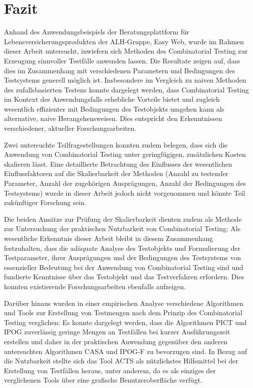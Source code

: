 \chapter{Fazit}

Anhand des Anwendungsbeispiels der Beratungsplattform für Lebensversicherungsprodukten der ALH-Gruppe, Easy Web, wurde im Rahmen dieser Arbeit untersucht, inwiefern sich Methoden des Combinatorial Testing zur Erzeugung sinnvoller Testfälle anwenden lassen. Die Resultate zeigen auf, dass dies im Zusammenhang mit verschiedenen Parametern und Bedingungen des Testsystems generell möglich ist. Insbesondere im Vergleich zu naiven Methoden des zufallsbasierten Testens konnte dargelegt werden, dass Combinatorial Testing im Kontext des Anwendungsfalls erhebliche Vorteile bietet und zugleich wesentlich effizienter mit Bedingungen des Testobjekts umgehen kann als alternative, naive Herangehensweisen. Dies entspricht den Erkenntnissen verschiedener, aktueller Forschungsarbeiten.

Zwei untersuchte Teilfragestellungen konnten zudem belegen, dass sich die Anwendung von Combinatorial Testing unter geringfügigen, zusätzlichen Kosten skalieren lässt. Eine detaillierte Betrachtung des Einflusses der wesentlichen Einflussfaktoren auf die Skalierbarkeit der Methoden (Anzahl zu testender Parameter, Anzahl der zugehörigen Ausprägungen, Anzahl der Bedingungen des Testsystems) wurde in dieser Arbeit jedoch nicht vorgenommen und könnte Teil zukünftiger Forschung sein.

Die beiden Ansätze zur Prüfung der Skalierbarkeit dienten zudem als Methode zur Untersuchung der praktischen Nutzbarkeit von Combinatorial Testing: Als wesentliche Erkenntnis dieser Arbeit bleibt in diesem Zusammenhang festzuhalten, dass die adäquate Analyse des Testobjekts und Formulierung der Testparameter, ihrer Ausprägungen und der Bedingungen des Testsystems von essenzieller Bedeutung bei der Anwendung von Combinatorial Testing sind und fundierte Kenntnisse über das Testobjekt und das Testverfahren erfordern. Dies konnten existierende Forschungsarbeiten ebenfalls aufzeigen.

Darüber hinaus wurden in einer empirischen Analyse verschiedene Algorithmen und Tools zur Erstellung von Testmengen nach dem Prinzip des Combinatorial Testing verglichen: Es konnte dargelegt werden, dass die Algorithmen PICT und IPOG zuverlässig geringe Mengen an Testfällen bei kurzer Ausführungszeit erstellen und daher in der praktischen Anwendung gegenüber den anderen untersuchten Algorithmen CASA und IPOG-F zu bevorzugen sind. In Bezug auf die Nutzbarkeit stellte sich das Tool ACTS als nützlichstes Hilfsmittel bei der Erstellung von Testfällen heraus, unter anderem, da es als einziges der verglichenen Tools über eine grafische Benutzeroberfläche verfügt.




